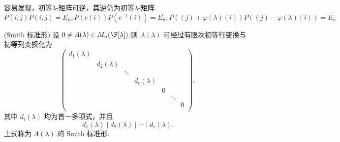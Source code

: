 	容易发现，初等$\lambda$-矩阵可逆，其逆仍为初等$\lambda$-矩阵
	\[P(i,j)P(i,j) =E_n,P(c(i))P(c^{-1}(i)) = E_n ,P((j)+\varphi(
	\lambda)(i))P((j)-\varphi(
	\lambda)(i)) = E_n\]
\begin{theorem}(Smith 标准形)
	设 $0\neq A(\lambda)\in M_n(\F[\lambda])$.则 $A(\lambda)$ 可经过有限次初等行变换与初等列变换化为
	\[
	\begin{pmatrix}
		d_1(\lambda) & & & &&& \\
		& d_2(\lambda) & & & &&\\
		& & \ddots & & &&\\
		& & & d_r(\lambda) &&& \\
		& & & & 0&&\\
		&&&&&\ddots&\\
		&&&&&&0\\
	\end{pmatrix},
	\]
	其中 $d_i(\lambda)$ 均为首一多项式，并且
	\[
	d_1(\lambda)\mid d_2(\lambda)\mid\cdots\mid d_r(\lambda).
	\]
	上式称为 $A(\lambda)$ 的 Smith 标准形.
\end{theorem}

